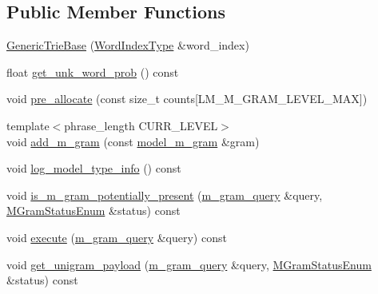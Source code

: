 \subsection*{Public Member Functions}
\begin{DoxyCompactItemize}
\item 
\hyperlink{classuva_1_1smt_1_1bpbd_1_1server_1_1lm_1_1_generic_trie_base_adf06ef5575344e94da478f4853b238fe}{Generic\+Trie\+Base} (\hyperlink{classuva_1_1smt_1_1bpbd_1_1server_1_1lm_1_1_word_index_trie_base_a77ee32bf3a9f8a89558bda4f2031200c}{Word\+Index\+Type} \&word\+\_\+index)
\item 
float \hyperlink{classuva_1_1smt_1_1bpbd_1_1server_1_1lm_1_1_generic_trie_base_a0bdaacfd1b26db77a9ea90979c4c1951}{get\+\_\+unk\+\_\+word\+\_\+prob} () const 
\item 
void \hyperlink{classuva_1_1smt_1_1bpbd_1_1server_1_1lm_1_1_generic_trie_base_a6b5be31d67fe3400098e9386092be510}{pre\+\_\+allocate} (const size\+\_\+t counts\mbox{[}L\+M\+\_\+\+M\+\_\+\+G\+R\+A\+M\+\_\+\+L\+E\+V\+E\+L\+\_\+\+M\+A\+X\mbox{]})
\item 
{\footnotesize template$<$phrase\+\_\+length C\+U\+R\+R\+\_\+\+L\+E\+V\+E\+L$>$ }\\void \hyperlink{classuva_1_1smt_1_1bpbd_1_1server_1_1lm_1_1_generic_trie_base_a4d9302ce1f939d0e5158c558ea0aeb97}{add\+\_\+m\+\_\+gram} (const \hyperlink{classuva_1_1smt_1_1bpbd_1_1server_1_1lm_1_1m__grams_1_1model__m__gram}{model\+\_\+m\+\_\+gram} \&gram)
\item 
void \hyperlink{classuva_1_1smt_1_1bpbd_1_1server_1_1lm_1_1_generic_trie_base_a45edc769e6f32db6029f1e9d7be55e80}{log\+\_\+model\+\_\+type\+\_\+info} () const 
\item 
void \hyperlink{classuva_1_1smt_1_1bpbd_1_1server_1_1lm_1_1_generic_trie_base_ad7a268fae8ff84e61d5c424be86dc42d}{is\+\_\+m\+\_\+gram\+\_\+potentially\+\_\+present} (\hyperlink{classuva_1_1smt_1_1bpbd_1_1server_1_1lm_1_1m__gram__query}{m\+\_\+gram\+\_\+query} \&query, \hyperlink{namespaceuva_1_1smt_1_1bpbd_1_1server_1_1lm_ab9b3e7382b561dcb8abcd6b55e9b796a}{M\+Gram\+Status\+Enum} \&status) const 
\item 
void \hyperlink{classuva_1_1smt_1_1bpbd_1_1server_1_1lm_1_1_generic_trie_base_af019cd6303beb29b79fe4f0fde5f4cb6}{execute} (\hyperlink{classuva_1_1smt_1_1bpbd_1_1server_1_1lm_1_1m__gram__query}{m\+\_\+gram\+\_\+query} \&query) const 
\item 
void \hyperlink{classuva_1_1smt_1_1bpbd_1_1server_1_1lm_1_1_generic_trie_base_aaba824101a7ca20885ebb9d847d3fc67}{get\+\_\+unigram\+\_\+payload} (\hyperlink{classuva_1_1smt_1_1bpbd_1_1server_1_1lm_1_1m__gram__query}{m\+\_\+gram\+\_\+query} \&query, \hyperlink{namespaceuva_1_1smt_1_1bpbd_1_1server_1_1lm_ab9b3e7382b561dcb8abcd6b55e9b796a}{M\+Gram\+Status\+Enum} \&status) const 

\end{DoxyCompactItemize}
